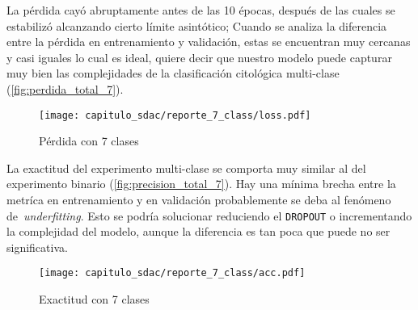 \begin{table}[H]
    \centering
    \caption{Estadísticos del experimento multi-clase}
    \label{tabla:estadisticos7}
    \end{table}

La pérdida cayó abruptamente antes de las 10 épocas, después de las cuales se
estabilizó alcanzando cierto límite asintótico; Cuando se analiza la diferencia
entre la pérdida en entrenamiento y validación, estas se encuentran muy cercanas
y casi iguales lo cual es ideal, quiere decir que nuestro modelo puede capturar
muy bien las complejidades de la clasificación citológica multi-clase
(\autoref{fig:perdida_total_7}).

\begin{figure}[H]
    \centering
    \texttt{[image: capitulo\_sdac/reporte\_7\_class/loss.pdf]}
    \caption{Pérdida con 7 clases}\label{fig:perdida_total_7}
\end{figure}

La exactitud del experimento multi-clase se comporta muy similar al del
experimento binario (\autoref{fig:precision_total_7}). Hay una mínima brecha
entre la metríca en entrenamiento y en validación probablemente se deba al
fenómeno de~\emph{underfitting}. Esto se podría solucionar reduciendo el
\texttt{DROPOUT} o incrementando la complejidad del modelo, aunque la
diferencia es tan poca que puede no ser significativa.

\begin{figure}[H]
    \centering
    \texttt{[image: capitulo\_sdac/reporte\_7\_class/acc.pdf]}
    \caption{Exactitud con 7 clases}\label{fig:precision_total_7}
\end{figure}


